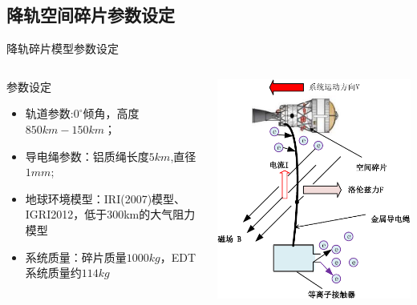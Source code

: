 \documentclass[sectioncirclenumberstyle]{le2iutbmbeamer}
\begin{document}
\subsection{降轨空间碎片参数设定}
\begin{frame}{降轨碎片模型参数设定}
\begin{columns}
\begin{column}{.5\linewidth}
\begin{block}{参数设定}
\begin{itemize}
\item 轨道参数:$0^\circ$倾角，高度$850\si{km}-150\si{km}$；
\item 导电绳参数：铝质绳长度$5\si{km}$,直径$1\si{mm}$;
\item 地球环境模型：IRI(2007)模型、IGRI2012，低于300km的大气阻力模型
\item 系统质量：碎片质量$1000\si{kg}$，EDT系统质量约$114\si{kg}$
\end{itemize}
\end{block}
\end{column}%
\hfil
\begin{column}{.5\linewidth}

\centering
\includegraphics[width=\linewidth]{figures/EDTsystem}
\end{column}
\end{columns}
\end{frame}
\end{document}
